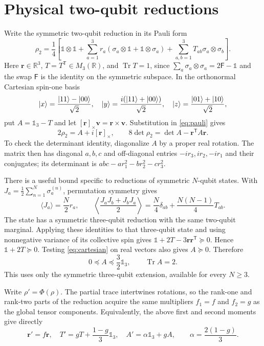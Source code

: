 \documentclass[11pt,a4paper]{article}
\DeclareMathOperator{\Tr}{Tr}
\newcommand{\id}{\mathds{1}}
\begin{document}
\section{Physical two-qubit reductions}
Write the symmetric two-qubit reduction in its Pauli form
\begin{equation}\label{eq:pauli}
 \rho_2=\frac14\left[\id\otimes\id+
 \sum_{a=1}^3r_a(\sigma_a\otimes\id+\id\otimes\sigma_a)
 +\sum_{a,b=1}^3T_{ab}\sigma_a\otimes\sigma_b\right].
\end{equation}
Here $\mathbf r\in\mathbb R^3$, $T=T^{\mathsf T}\in M_3(\mathbb R)$,
and $\Tr T=1$, since $\sum_a\sigma_a\otimes\sigma_a=2\mathsf F-\id$
and the swap $\mathsf F$ is the identity on the symmetric subspace.
In the orthonormal Cartesian spin-one basis
\[
 \ket{x}=\frac{\ket{11}-\ket{00}}{\sqrt2},\quad
 \ket{y}=\frac{i(\ket{11}+\ket{00})}{\sqrt2},\quad
 \ket{z}=\frac{\ket{01}+\ket{10}}{\sqrt2},
\]
put $A=\id_3-T$ and let $[\mathbf r]_\times\mathbf v=
\mathbf r\times\mathbf v$. Substitution in \eqref{eq:pauli} gives
\begin{equation}\label{eq:cartesian}
 2\rho_2=A+i[\mathbf r]_\times,\qquad
 8\det\rho_2=\det A-\mathbf r^{\mathsf T}A\mathbf r.
\end{equation}
To check the determinant identity, diagonalize $A$ by a proper real
rotation. The matrix then has diagonal $a,b,c$ and off-diagonal entries
$-ir_3,ir_2,-ir_1$ and their conjugates; its determinant is
$abc-ar_1^2-br_2^2-cr_3^2$.

There is a useful bound specific to reductions of symmetric $N$-qubit
states. With $J_a=\frac12\sum_{n=1}^N\sigma_a^{(n)}$, permutation
symmetry gives
\[
 \langle J_a\rangle=\frac N2r_a,\qquad
 \left\langle\frac{J_aJ_b+J_bJ_a}{2}\right\rangle
 =\frac N4\delta_{ab}+\frac{N(N-1)}4T_{ab}.
\]
The state has a symmetric three-qubit reduction with the same two-qubit
marginal. Applying these identities to that three-qubit state and using
nonnegative variance of its collective spin gives
$\id+2T-3\mathbf r\mathbf r^{\mathsf T}\succeq0$.
Hence $\id+2T\succeq0$. Testing \eqref{eq:cartesian} on real
vectors also gives $A\succeq0$. Therefore
\begin{equation}\label{eq:A-bounds}
 0\preceq A\preceq\frac32\id_3,\qquad\Tr A=2.
\end{equation}
This uses only the symmetric three-qubit extension, available for every
$N\ge3$.

Write $\rho'=\Phi(\rho)$. The partial trace intertwines rotations,
so the rank-one and rank-two parts of the reduction acquire the same
multipliers $f_1=f$ and $f_2=g$ as the global tensor components.
Equivalently, the above first and second moments give directly
\begin{equation}\label{eq:transform}
 \mathbf r'=f\mathbf r,\quad T'=gT+\frac{1-g}{3}\id_3,
 \quad A'=\alpha\id_3+gA,\qquad\alpha=\frac{2(1-g)}3.
\end{equation}
\end{document}
